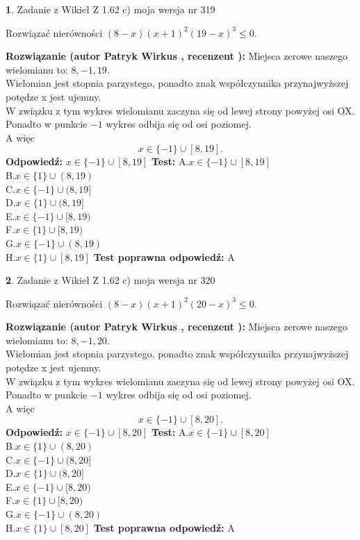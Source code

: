 \documentclass[12pt, a4paper]{article}
\theoremstyle{definition} %
\newtheorem{zad}{}
\newcommand{\zadStart}[1]{\begin{zad}#1\newline}
\newcommand{\zadStop}{\end{zad}}
\newcommand{\rozwStart}[2]{\noindent \textbf{Rozwiązanie (autor #1 , recenzent #2): }\newline}
\newcommand{\rozwStop}{\newline}
\newcommand{\odpStart}{\noindent \textbf{Odpowiedź:}\newline}
\newcommand{\odpStop}{\newline}
\newcommand{\testStart}{\noindent \textbf{Test:}\newline}
\newcommand{\testStop}{\newline}
\newcommand{\kluczStart}{\noindent \textbf{Test poprawna odpowiedź:}\newline}
\newcommand{\kluczStop}{\newline}
\begin{document}
\zadStart{Zadanie z Wikieł Z 1.62 c) moja wersja nr 319}

Rozwiązać nierówności $(8-x)(x+1)^{2}(19-x)^{3}\le0$.
\zadStop
\rozwStart{Patryk Wirkus}{}
Miejsca zerowe naszego wielomianu to: $8, -1, 19$.\\
Wielomian jest stopnia parzystego, ponadto znak współczynnika przy\linebreak najwyższej potędze x jest ujemny.\\ W związku z tym wykres wielomianu zaczyna się od lewej strony powyżej osi OX.\\
Ponadto w punkcie $-1$ wykres odbija się od osi poziomej.\\
A więc $$x \in \{-1\} \cup [8,19].$$
\rozwStop
\odpStart
$x \in \{-1\} \cup [8,19]$
\odpStop
\testStart
A.$x \in \{-1\} \cup [8,19]$\\
B.$x \in \{1\} \cup (8,19)$\\
C.$x \in \{-1\} \cup (8,19]$\\
D.$x \in \{1\} \cup (8,19]$\\
E.$x \in \{-1\} \cup [8,19)$\\
F.$x \in \{1\} \cup [8,19)$\\
G.$x \in \{-1\} \cup (8,19)$\\
H.$x \in \{1\} \cup [8,19]$
\testStop
\kluczStart
A
\kluczStop



\zadStart{Zadanie z Wikieł Z 1.62 c) moja wersja nr 320}

Rozwiązać nierówności $(8-x)(x+1)^{2}(20-x)^{3}\le0$.
\zadStop
\rozwStart{Patryk Wirkus}{}
Miejsca zerowe naszego wielomianu to: $8, -1, 20$.\\
Wielomian jest stopnia parzystego, ponadto znak współczynnika przy\linebreak najwyższej potędze x jest ujemny.\\ W związku z tym wykres wielomianu zaczyna się od lewej strony powyżej osi OX.\\
Ponadto w punkcie $-1$ wykres odbija się od osi poziomej.\\
A więc $$x \in \{-1\} \cup [8,20].$$
\rozwStop
\odpStart
$x \in \{-1\} \cup [8,20]$
\odpStop
\testStart
A.$x \in \{-1\} \cup [8,20]$\\
B.$x \in \{1\} \cup (8,20)$\\
C.$x \in \{-1\} \cup (8,20]$\\
D.$x \in \{1\} \cup (8,20]$\\
E.$x \in \{-1\} \cup [8,20)$\\
F.$x \in \{1\} \cup [8,20)$\\
G.$x \in \{-1\} \cup (8,20)$\\
H.$x \in \{1\} \cup [8,20]$
\testStop
\kluczStart
A
\kluczStop
\end{document}
